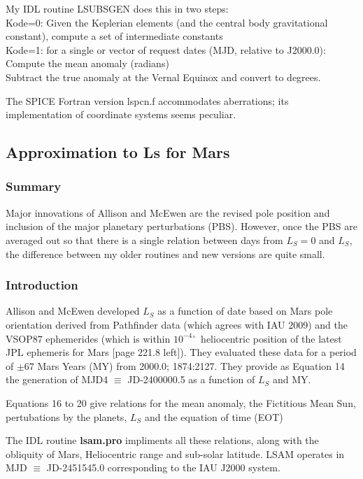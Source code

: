\documentclass[draft]{article}
\newcommand{\qi}{\\ \hspace*{2.em}}      %
\newcommand{\qd}{$^\circ$}        %
\newcommand{\np}{\textbf}  %
\newcommand{\Em}[1]{$10^{-#1} $}        %
\begin{document}
My IDL routine LSUBSGEN does this in two steps:
\\ Kode=0: Given the Keplerian elements (and the central body gravitational
constant), compute a set of intermediate constants
\\ Kode=1: for a single or vector of request dates (MJD, relative to J2000.0):
\qi Compute the mean anomaly (radians)
\qi Subtract the true anomaly at the Vernal Equinox and convert to degrees.

The SPICE Fortran version lspcn.f accommodates aberrations; its implementation of
coordinate systems seems peculiar.


\subsection{Approximation to Ls for Mars}
\subsubsection{Summary} 
Major innovations of Allison and McEwen are the revised pole position and
inclusion of the major planetary perturbations (PBS). However, once the PBS are
averaged out so that there is a single relation between days from $L_S=0$ and
$L_S$, the difference between my older routines and new versions are quite small.

\subsubsection{Introduction} %
 Allison and McEwen \cite{Allison00} developed $L_S$ as a function of date based
 on Mars pole orientation derived from Pathfinder data (which agrees with IAU
 2009) and the VSOP87 ephemerides (which is within \Em4\qd ~heliocentric
 position of the latest JPL ephemeris for Mars [page 221.8 left]).  They
 evaluated these data for a period of $\pm 67$ Mars Years (MY) from 2000.0;
 1874:2127.  They provide as Equation 14 the generation of MJD4 $\equiv$
 JD-2400000.5 as a function of $L_S$ and MY.

Equations 16 to 20 give relations for the mean anomaly, the Fictitious Mean Sun,
pertubations by the planets, $L_S$ and the equation of time (EOT)

The IDL routine \np{lsam.pro} impliments all these relations, along with the
obliquity of Mars, Heliocentric range and sub-solar latitude. LSAM operates in
MJD $\equiv$ JD-2451545.0 corresponding to the IAU J2000 system.
\end{document}
